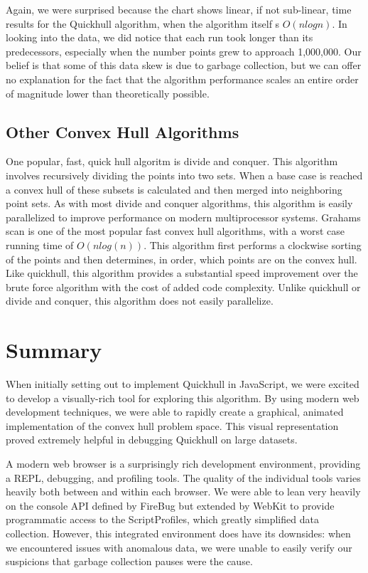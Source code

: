 \documentclass[11pt]{article}
\begin{document}
Again, we were surprised because the chart shows linear, if not sub-linear, time results for the Quickhull algorithm, when the algorithm itself s $O(n log n)$. In looking into the data, we did notice that each run took longer than its predecessors, especially when the number points grew to approach 1,000,000. Our belief is that some of this data skew is due to garbage collection, but we can offer no explanation for the fact that the algorithm performance scales an entire order of magnitude lower than theoretically possible.

\subsection{Other Convex Hull Algorithms}
One popular, fast, quick hull algoritm is divide and conquer. This algorithm involves recursively dividing the points into two sets. When a base case is reached a convex hull of these subsets is calculated and then merged into neighboring point sets. As with most divide and conquer algorithms, this algorithm is easily parallelized to improve performance on modern multiprocessor systems.
Grahams scan is one of the most popular fast convex hull algorithms, with a worst case running time of $O(nlog(n))$. This algorithm first performs a clockwise sorting of the points and then determines, in order, which points are on the convex hull. Like quickhull, this algorithm provides a substantial speed improvement over the brute force algorithm with the cost of added code complexity. Unlike quickhull or divide and conquer, this algorithm does not easily parallelize.
\section{Summary}
When initially setting out to implement Quickhull in JavaScript, we were excited to develop a visually-rich tool for exploring this algorithm. By using modern web development techniques, we were able to rapidly create a graphical, animated implementation of the convex hull problem space. This visual representation proved extremely helpful in debugging Quickhull on large datasets.

A modern web browser is a surprisingly rich development environment, providing a REPL, debugging, and profiling tools. The quality of the individual tools varies heavily both between and within each browser. We were able to lean very heavily on the console API defined by FireBug but extended by WebKit to provide programmatic access to the ScriptProfiles, which greatly simplified data collection. However, this integrated environment does have its downsides: when we encountered issues with anomalous data, we were unable to easily verify our suspicions that garbage collection pauses were the cause.
\end{document}

